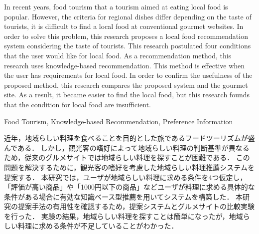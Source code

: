 \documentclass{funthesis}
\begin{document}
\maketitle       %

\begin{eabstract}
In recent years, food tourism that a tourism aimed at eating local food is popular.
However, the criteria for regional dishes differ depending on the taste of tourists, it is difficult to find a local food at conventional gourmet websites.
In order to solve this problem, this research proposes a local food recommendation system considering the taste of tourists.
This research postulated four conditions that the user would like for local food.
As a recommendation method, this research uses knowledge-based recommendation.
This method is effective when the user has requirements for local food.
In order to confirm the usefulness of the proposed method, this research compares the proposed system and the gourmet site.
As a result, it became easier to find the local food, but this research founds that the condition for local food are insufficient.
\end{eabstract}

\begin{ekeyword}
Food Tourism, Knowledge-based Recommendation, Preference Information
\end{ekeyword}

\begin{jabstract}
近年，地域らしい料理を食べることを目的とした旅であるフードツーリズムが盛んである．
しかし，観光客の嗜好によって地域らしい料理の判断基準が異なるため，従来のグルメサイトでは地域らしい料理を探すことが困難である．
この問題を解決するために，観光客の嗜好を考慮した地域らしい料理推薦システムを提案する．
本研究では，ユーザが地域らしい料理に求める条件を4つ仮定し，
「評価が高い商品」や「1000円以下の商品」などユーザが料理に求める具体的な条件がある場合に有効な知識ベース型推薦を用いてシステムを構築した．
本研究の提案手法の有用性を確認するため，提案システムとグルメサイトの比較実験を行った．
実験の結果，地域らしい料理を探すことは簡単になったが，地域らしい料理に求める条件が不足していることがわかった．
\end{jabstract}
\end{document}
